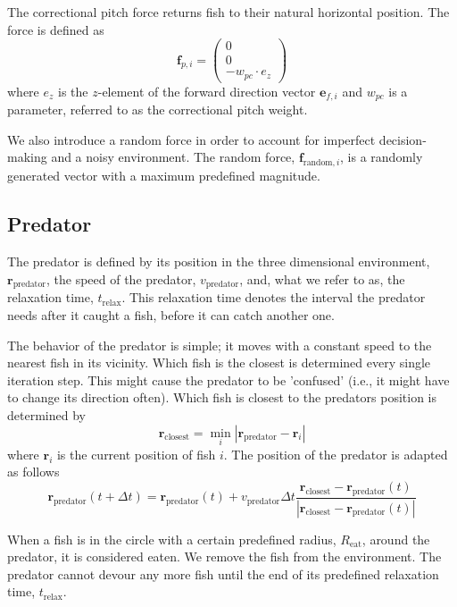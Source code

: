 \documentclass[11pt,a4paper]{article}
\begin{document}
The correctional pitch force returns fish to their natural horizontal position. The force is defined as
\begin{equation}
\mathbf{f}_{p, i} = \begin{pmatrix}0 \\ 0 \\ -w_{pc} \cdot e_z \end{pmatrix}
\label{eq:fp}
\end{equation}
where $e_z$ is the $z$-element of the forward direction vector $\mathbf{e}_{f,i}$ and $w_{pc}$ is a parameter, referred to as the correctional pitch weight. 

We also introduce a random force in order to account for imperfect decision-making and a noisy environment. The random force, $\mathbf{f}_{\text{random},i}$, is a randomly generated vector with a maximum predefined magnitude. 

\subsection{Predator} 
The predator is defined by its position in the three dimensional environment, $\mathbf{r}_\text{predator}$, the speed of the predator, $v_\text{predator}$, and, what we refer to as, the relaxation time, $t_\text{relax}$. This relaxation time denotes the interval the predator needs after it caught a fish, before it can catch another one. 

The behavior of the predator is simple; it moves with a constant speed to the nearest fish in its vicinity. Which fish is the closest is determined every single iteration step. This might cause the predator to be 'confused' (i.e., it might have to change its direction often). 
Which fish is closest to the predators position is determined by
$$
\mathbf{r}_\text{closest} = \operatorname*{min}_{i} |\mathbf{r}_\text{predator} - \mathbf{r}_i|
$$
where $\mathbf{r}_{i}$ is the current position of fish $i$. The position of the predator is adapted as follows
\begin{equation}
\mathbf{r}_\text{predator}(t + \Delta t) = \mathbf{r}_\text{predator}(t) + v_\text{predator} \Delta t \frac{\mathbf{r}_\text{closest} - \mathbf{r}_\text{predator}(t)}{\left|\mathbf{r}_\text{closest} - \mathbf{r}_\text{predator}(t) \right|}
\label{eq:fpredator}
\end{equation}

When a fish is in the circle with a certain predefined radius, $R_\text{eat}$, around the predator, it is considered eaten. We remove the fish from the environment. The predator cannot devour any more fish until the end of its predefined relaxation time, $t_\text{relax}$. 
\end{document}
